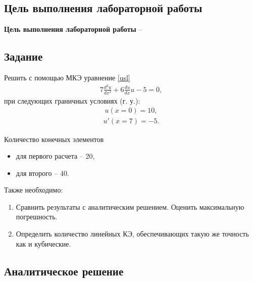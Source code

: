 \subsection{Цель выполнения лабораторной работы}\label{blockN.VariantM}
\textbf{Цель выполнения лабораторной работы }-- \GoalOfResearch

\subsection{Задание}

Решить с помощью МКЭ уравнение \ref{usl}
\begin{align}\label{usl}
7\frac{d^2u}{dx^2}   +6 \frac{du}{dx}    u  -5 
=0,
\end{align}
при следующих граничных условиях (г. у.): 
\begin{align}\label{1_gu}
    u(x=0) = 10,
\end{align}
\begin{align}\label{2_gu}
    u'(x=7) = -5.
\end{align}

Количество конечных элементов
\begin{itemize}
    \item для первого расчета -- 20,
    \item для второго -- 40.
\end{itemize}

Также необходимо:
\begin{enumerate}
    \item Сравнить результаты с аналитическим решением. Оценить максимальную погрешность.
    \item Определить количество линейных КЭ, обеспечивающих такую же точность как и кубические.
\end{enumerate}

\newpage
\subsection{Аналитическое решение}

